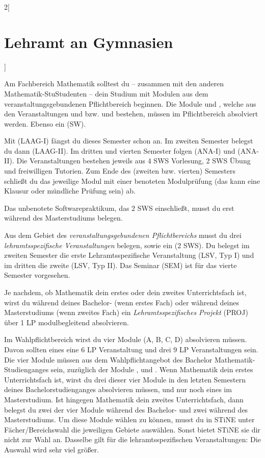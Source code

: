 \begin{multicols}{2}[\section{Lehramt an Gymnasien}]

Am Fachbereich Mathematik solltest du -- zusammen mit den anderen
Mathematik-StuStudenten -- dein Studium mit Modulen aus dem
veranstaltungsgebundenen Pflichtbereich beginnen. Die Module 
und , welche aus den
Veranstaltungen  und  bzw.  und  bestehen, müssen im Pflichtbereich
absolviert werden. Ebenso ein  (SW).

Mit  (LAAG-I) fängst du
dieses Semester schon an. Im zweiten Semester belegst du dann  (LAAG-II). Im dritten und vierten Semester
folgen  (ANA-I) und  (ANA-II). Die
Veranstaltungen bestehen jeweils aus 4 SWS Vorlesung, 2 SWS Übung und
freiwilligen Tutorien. Zum Ende des (zweiten bzw. vierten) Semesters schließt
du das jeweilige Modul mit einer benoteten Modulprüfung (das kann eine Klausur
oder mündliche Prüfung sein) ab.

Das unbenotete Softwarepraktikum, das 2 SWS einschließt, musst du erst während
des Masterstudiums belegen. 

Aus dem Gebiet des \emph{veranstaltungsgebundenen Pflichtbereichs} musst du
drei \emph{lehramtsspezifische Veranstaltungen} belegen, sowie ein
 (2 SWS).  Du belegst im zweiten Semester die erste
Lehramtsspezifische Veranstaltung (LSV, Typ I) und im dritten die zweite (LSV,
Typ II).  Das Seminar (SEM) ist für das vierte Semester vorgesehen.

Je nachdem, ob Mathematik dein erstes oder dein zweites Unterrichtsfach ist,
wirst du während deines Bachelor- (wenn erstes Fach) oder während deines
Masterstudiums (wenn zweites Fach) ein \emph{Lehramtsspezifisches Projekt}
(PROJ) über 1 LP modulbegleitend absolvieren.

Im Wahlpflichtbereich wirst du vier Module (A, B, C, D) absolvieren müssen.
Davon sollten eines eine 6 LP Veranstaltung und drei 9 LP Veranstaltungen sein.
Die vier Module müssen aus dem Wahlpflichtangebot des Bachelor
Mathematik-Studienganges sein, zuzüglich der Module ,
 und . Wenn
Mathematik dein erstes Unterrichtsfach ist, wirst du drei dieser vier Module in
den letzten Semestern deines Bachelorstudienganges absolvieren müssen, und nur
noch eines im Masterstudium.  Ist hingegen Mathematik dein zweites
Unterrichtsfach, dann belegst du zwei der vier Module während des Bachelor- und
zwei während des Masterstudiums. Um diese Module wählen zu können, musst du in
STiNE unter Fächer/Bereichswahl die jeweiligen Gebiete auswählen. Sonst bietet
STiNE sie dir nicht zur Wahl an. Dasselbe gilt für die lehramtsspezifischen
Veranstaltungen: Die Auswahl wird sehr viel größer.


\end{multicols}
